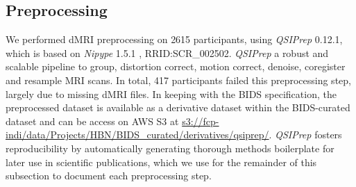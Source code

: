 \documentclass[fleqn,10pt,inline]{wlscirep}
\begin{document}
\subsection*{Preprocessing}

We performed dMRI preprocessing on \num{2615} participants, using \emph{QSIPrep}
\cite{cieslak2021-iq} 0.12.1, which is based on \emph{Nipype} 1.5.1
\cite{nipype1,nipype2}, RRID:SCR\_002502. \emph{QSIPrep} a robust and scalable
pipeline to group, distortion correct, motion correct, denoise, coregister and
resample MRI scans. In total, \num{417} participants failed this preprocessing
step, largely due to missing dMRI files. 
In keeping with the BIDS specification,
the preprocessed dataset is available as a derivative dataset within the
BIDS-curated dataset and can be access on AWS S3 at
\url{s3://fcp-indi/data/Projects/HBN/BIDS_curated/derivatives/qsiprep/}.
\emph{QSIPrep} fosters reproducibility by automatically generating thorough
methods boilerplate for later use in scientific publications, which we use for
the remainder of this subsection to document each preprocessing step.
\end{document}

